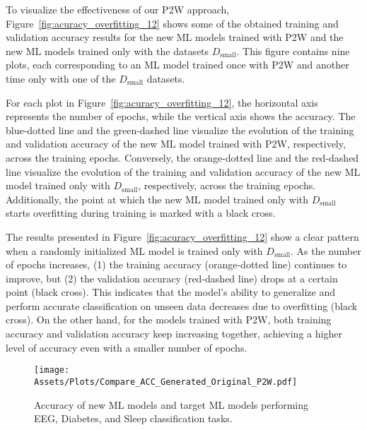 \documentclass[letterpaper]{article}
\begin{document}
To visualize the effectiveness of our P2W approach, Figure~\ref{fig:acuracy_overfitting_12} shows some of the obtained training and validation accuracy results for the new ML models trained with P2W and the new ML models trained only with the datasets $D_{\text{small}}$. This figure contains nine plots, each corresponding to an ML model trained once with P2W and another time only with one of the $D_{\text{small}}$ datasets.

For each plot in Figure~\ref{fig:acuracy_overfitting_12}, the horizontal axis represents the number of epochs, while the vertical axis shows the accuracy. The blue-dotted line and the green-dashed line visualize the evolution of the training and validation accuracy of the new ML model trained with P2W, respectively, across the training epochs. Conversely, the orange-dotted line and the red-dashed line visualize the evolution of the training and validation accuracy of the new ML model trained only with $D_{\text{small}}$, respectively, across the training epochs. Additionally, the point at which the new ML model trained only with $D_{\text{small}}$ starts overfitting during training is marked with a black cross.

The results presented in Figure~\ref{fig:acuracy_overfitting_12} show a clear pattern when a randomly initialized ML model is trained only with $D_{\text{small}}$. As the number of epochs increases, (1) the training accuracy (orange-dotted line) continues to improve, but (2) the validation accuracy (red-dashed line) drops at a certain point (black cross). This indicates that the model’s ability to generalize and perform accurate classification on unseen data decreases due to overfitting (black cross). On the other hand, for the models trained with P2W, both training accuracy and validation accuracy keep increasing together, achieving a higher level of accuracy even with a smaller number of epochs.

\begin{figure}[!t]
\centerline{\texttt{[image: Assets/Plots/Compare\_ACC\_Generated\_Original\_P2W.pdf]}}
\vspace{-10pt}
    \caption{Accuracy of new ML models and target ML models performing EEG, Diabetes, and Sleep classification tasks.}
    \label{plo:Compare_generated_original_acc}
\end{figure}
\end{document}
